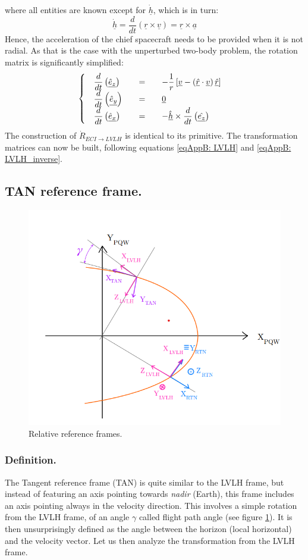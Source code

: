 			\noindent where all entities are known except for $\underline{\dot{h}}$, which is in turn:
			\[
			\underline{\dot{h}} = \dfrac{d}{dt} \left(\underline{r}\times \underline{v}\right) = \underline{r} \times \underline{a}
			\]
			\indent Hence, the acceleration of the chief spacecraft needs to be provided when it is not radial. As that is the case with the unperturbed two-body problem, the rotation matrix is significantly simplified:
			\[
			\arraycolsep=10pt
			\def\arraystretch{1.3}
			\left\{ \begin{array}{lllll}
			\dfrac{d}{dt} \left(\underline{\hat{e}_z}\right) 	& = & - \dfrac{1}{r} \left[ \underline{v} - \left(\underline{\hat{r}} \cdot \underline{v}\right)\underline{\hat{r}}\right] \\
			\dfrac{d}{dt} \left(\underline{\hat{e}_y}\right) 	& = & 	\underline{0} \\
			\dfrac{d}{dt} \left(\underline{\hat{e}_x}\right) 	& = & - \underline{\hat{h}} \times \dfrac{d}{dt} \left(\underline{\hat{e_z}}\right) 
			\end{array} \right.
			\]
			\indent The construction of $\dot{R}_{ECI\to LVLH}$	is identical to its primitive. The transformation matrices can now be built, following equations \ref{eqAppB: 	LVLH} and \ref{eqAppB: 	LVLH_inverse}.
			
	\subsection{TAN reference frame.}
	\begin{figure}[!htb]
	\centering\includegraphics[width = 0.6\linewidth]{Appendices/Appendix_B/RTN_LVLH_TAN}
	\caption{Relative reference frames.}
	\label{fig:	RTN_LVLH_TAN}
	\end{figure}
	\FloatBarrier
		\subsubsection{Definition.}
		\indent The Tangent reference frame (TAN) is quite similar to the LVLH frame, but instead of featuring an axis pointing towards \textit{nadir} (Earth), this frame includes an axis pointing always in the velocity direction. This involves a simple rotation from the LVLH frame, of an angle $\gamma$ called flight path angle (see figure \ref{fig:	RTN_LVLH_TAN}). It is then unsurprisingly defined as the angle between the horizon (local horizontal) and the velocity vector. Let us then analyze the transformation from the LVLH frame.
